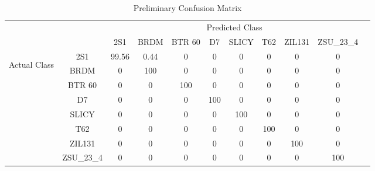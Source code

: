\begin{table}
	\centering
	\begin{tabular}{|*{11}{c|}}
		
		\cline{3-10}
		\multicolumn{2}{c|}{}         & \multicolumn{8}{|c|}{Predicted Class} 			\\ \cline{3-10}
		\multicolumn{2}{c|}{}                  & 2S1 & BRDM & BTR 60 & D7 & SLICY & T62 & ZIL131 & ZSU\_23\_4 \\ \hline
		\multirow{8}{*}{\begin{turn}{90}Actual Class\end{turn}}
				        & 2S1        & 99.56 & 0.44 & 0 & 0 & 0 & 0 & 0 & 0 	\\ \cline{2-10}
                        & BRDM       & 0 & 100 & 0 & 0 & 0 & 0 & 0 & 0 	\\ \cline{2-10}
                        & BTR 60     & 0 & 0 & 100 & 0 & 0 & 0 & 0 & 0 	\\ \cline{2-10}
                        & D7 	     & 0 & 0 & 0 & 100 & 0 & 0 & 0 & 0 	\\ \cline{2-10}
                        & SLICY      & 0 & 0 & 0 & 0 & 100 & 0 & 0 & 0 	\\ \cline{2-10}
                        & T62        & 0 & 0 & 0 & 0 & 0 & 100 & 0 & 0 	\\ \cline{2-10}
                        & ZIL131 	 & 0 & 0 & 0 & 0 & 0 & 0 & 100 & 0 	\\ \cline{2-10}
                        & ZSU\_23\_4 & 0 & 0 & 0 & 0 & 0 & 0 & 0 & 100 	\\ \cline{2-10} 
		\hline	\end{tabular}
	\label{tab:prelim_conf}
	\caption{Preliminary Confusion Matrix}
	\centering
\end{table}

